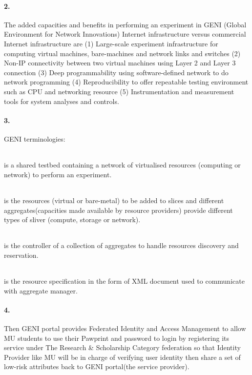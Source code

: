 \documentclass[a4paper]{article}
\begin{document}
\paragraph{2. } The added capacities and benefits in performing an experiment in GENI (Global Environment for Network Innovations) Internet infrastructure versus commercial Internet infrastructure are (1) Large-scale experiment infrastructure for computing virtual machines, bare-machines and network links and switches (2) Non-IP connectivity between two virtual machines using Layer 2 and Layer 3 connection (3) Deep programmability using software-defined network to do network programming (4) Reproducibility to offer repeatable testing environment such as CPU and networking resource (5) Instrumentation and measurement tools for system analyses and controls.

\paragraph{3. } GENI terminologies:
\begin{description}
\leftskip 0.4in
\parindent -0.4in
	\item[Slice: ] \hfill \\is a shared testbed containing a network of virtualised resources (computing or network) to perform an experiment.
	\item[Sliver: ] \hfill \\is the resources (virtual or bare-metal) to be added to slices and different aggregates(capacities made available by resource providers) provide different types of sliver (compute, storage or network).
	\item[Aggregate manager: ] \hfill \\is the controller of a collection of aggregates to handle resources discovery and reservation.
	\item[Rspec: ] \hfill \\is the resource specification in the form of XML document used to communicate with aggregate manager.
\end{description}

\paragraph{4. } Then GENI portal provides Federated Identity and Access Management to allow MU students to use their Pawprint and password to login by registering its service under The Research \& Scholarship Category federation so that Identity Provider like MU will be in charge of verifying user identity then share a set of low-risk attributes back to GENI portal(the service provider).\\
\end{document}
